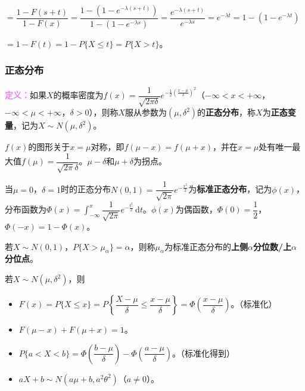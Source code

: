 \documentclass[UTF8, 12pt]{ctexart}
\begin{document}
$=\dfrac{1-F(s+t)}{1-F(x)}=\dfrac{1-(1-e^{-\lambda(s+t)})}{1-(1-e^{-\lambda s})}=\dfrac{e^{-\lambda(s+t)}}{e^{-\lambda s}}=e^{-\lambda t}=1-(1-e^{-\lambda t})$

$=1-F(t)=1-P\{X\leqslant t\}=P\{X>t\}$。

\subsubsection{正态分布}

\textcolor{violet}{\textbf{定义：}}如果$X$的概率密度为$f(x)=\dfrac{1}{\sqrt{2\pi\delta}}e^{-\frac{1}{2}(\frac{x-\mu}{\delta})^2}$（$-\infty<x<+\infty$，$-\infty<\mu<+\infty$，$\delta>0$），则称$X$服从参数为$(\mu,\delta^2)$的\textbf{正态分布}，称$X$为\textbf{正态变量}，记为$X\sim N(\mu,\delta^2)$。

$f(x)$的图形关于$x=\mu$对称，即$f(\mu-x)=f(\mu+x)$，并在$x=\mu$处有唯一最大值$f(\mu)=\dfrac{1}{\sqrt{2\pi}\delta}$。$\mu-\delta$和$\mu+\delta$为拐点。


当$\mu=0$，$\delta=1$时的正态分布$N(0,1)=\dfrac{1}{\sqrt{2\pi}}e^{-\frac{x^2}{2}}$为\textbf{标准正态分布}，记为$\phi(x)$，分布函数为$\varPhi(x)=\displaystyle{\int_{-\infty}^x\dfrac{1}{\sqrt{2\pi}}e^{-\frac{t^2}{2}}\,\textrm{d}t}$。$\phi(x)$为偶函数，$\varPhi(0)=\dfrac{1}{2}$，$\varPhi(-x)=1-\varPhi(x)$。

若$X\sim N(0,1)$，$P\{X>\mu_\alpha\}=\alpha$，则称$\mu_\alpha$为标准正态分布的\textbf{上侧$\alpha$分位数/上$\alpha$分位点}。

若$X\sim N(\mu,\delta^2)$，则

\begin{itemize}
    \item $F(x)=P\{X\leqslant x\}=P\left\{\dfrac{X-\mu}{\delta}\leqslant\dfrac{x-\mu}{\delta}\right\}=\varPhi\left(\dfrac{x-\mu}{\delta}\right)$。（标准化）
    \item $F(\mu-x)+F(\mu+x)=1$。
    \item $P\{a<X<b\}=\varPhi\left(\dfrac{b-\mu}{\delta}\right)-\varPhi\left(\dfrac{a-\mu}{\delta}\right)$。（标准化得到）
    \item $aX+b\sim N(a\mu+b,a^2\theta^2)$（$a\neq0$）。
\end{itemize}
\end{document}
